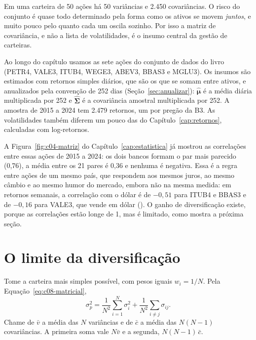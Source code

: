 \begin{intuicao}
Em uma carteira de 50 ações há 50 variâncias e 2.450 covariâncias. O risco do conjunto é quase todo determinado pela forma como os ativos se movem \emph{juntos}, e muito pouco pelo quanto cada um oscila sozinho. Por isso a matriz de covariância, e não a lista de volatilidades, é o insumo central da gestão de carteiras.
\end{intuicao}

Ao longo do capítulo usamos as sete ações do conjunto de dados do livro (PETR4, VALE3, ITUB4, WEGE3, ABEV3, BBAS3 e MGLU3). Os insumos são estimados com retornos simples diários, que são os que se somam entre ativos, e anualizados pela convenção de 252 dias (Seção~\ref{sec:anualizar}): $\hat{\symbf{\mu}}$ é a média diária multiplicada por 252 e $\hat{\symbf{\Sigma}}$ é a covariância amostral multiplicada por 252. A amostra de 2015 a 2024 tem 2.479 retornos, um por pregão da B3. As volatilidades também diferem um pouco das do Capítulo~\ref{cap:retornos}, calculadas com log-retornos.

A Figura~\ref{fig:c04-matriz} do Capítulo~\ref{cap:estatistica} já mostrou as correlações entre essas ações de 2015 a 2024: os dois bancos formam o par mais parecido (0,76), a média entre os 21 pares é 0,36 e nenhuma é negativa. Essa é a regra entre ações de um mesmo país, que respondem aos mesmos juros, ao mesmo câmbio e ao mesmo humor do mercado, embora não na mesma medida: em retornos semanais, a correlação com o dólar é de $-0,51$ para ITUB4 e BBAS3 e de $-0,16$ para VALE3, que vende em dólar (). O ganho de diversificação existe, porque as correlações estão longe de 1, mas é limitado, como mostra a próxima seção.

\section{O limite da diversificação}
\label{sec:c08-limite}

Tome a carteira mais simples possível, com pesos iguais $w_i = 1/N$. Pela Equação~\eqref{eq:c08-matricial},
\[
  \sigma_p^2 = \frac{1}{N^2}\sum_{i=1}^{N}\sigma_i^2 + \frac{1}{N^2}\sum_{i \neq j}\sigma_{ij} .
\]
Chame de $\bar v$ a média das $N$ variâncias e de $\bar c$ a média das $N(N-1)$ covariâncias. A primeira soma vale $N\bar v$ e a segunda, $N(N-1)\,\bar c$.

